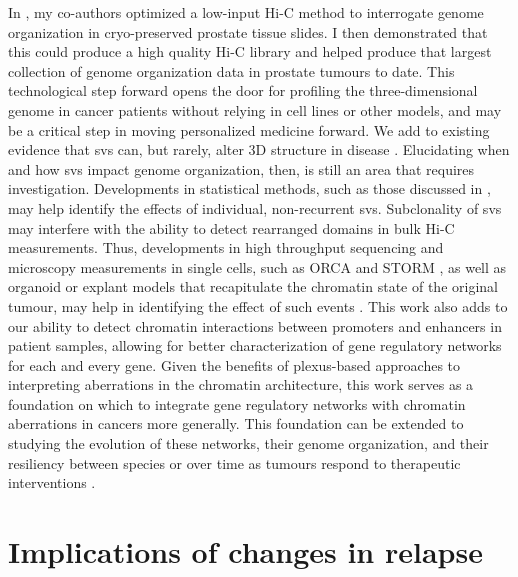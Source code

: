 In , my co-authors optimized a low-input Hi-C method to interrogate genome organization in cryo-preserved prostate tissue slides.
I then demonstrated that this could produce a high quality Hi-C library and helped produce that largest collection of genome organization data in prostate tumours to date.
This technological step forward opens the door for profiling the three-dimensional genome in cancer patients without relying in cell lines or other models, and may be a critical step in moving personalized medicine forward.
We add to existing evidence that \glspl{sv} can, but rarely, alter 3D structure in disease \cite{ghavi-helmHighlyRearrangedChromosomes2019,oudelaarRelationshipGenomeStructure2020,despangFunctionalDissectionSox92019,williamsonDevelopmentallyRegulatedShh2019,dixonIntegrativeDetectionAnalysis2018,akdemirDisruptionChromatinFolding2020,liPatternsSomaticStructural2020,iyyankiSubtypeassociatedEpigenomicLandscape2021}.
Elucidating when and how \glspl{sv} impact genome organization, then, is still an area that requires investigation.
Developments in statistical methods, such as those discussed in , may help identify the effects of individual, non-recurrent \glspl{sv}.
Subclonality of \glspl{sv} may interfere with the ability to detect rearranged domains in bulk Hi-C measurements.
Thus, developments in high throughput sequencing and microscopy measurements in single cells, such as ORCA \cite{mateoVisualizingDNAFolding2019} and STORM \cite{batesStochasticOpticalReconstruction2013}, as well as organoid or explant models that recapitulate the chromatin state of the original tumour, may help in identifying the effect of such events \cite{}.
This work also adds to our ability to detect chromatin interactions between promoters and enhancers in patient samples, allowing for better characterization of gene regulatory networks for each and every gene.
Given the benefits of plexus-based approaches to interpreting aberrations in the chromatin architecture, this work serves as a foundation on which to integrate gene regulatory networks with chromatin aberrations in cancers more generally.
This foundation can be extended to studying the evolution of these networks, their genome organization, and their resiliency between species or over time as tumours respond to therapeutic interventions \cite{}.

\section{Implications of  changes in relapse}

